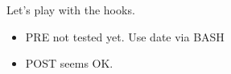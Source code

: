 \documentclass{article}
\begin{document}
Let's play with the hooks.

\begin{itemize}
    \item PRE not tested yet. Use date via BASH

    \item POST seems OK.
\end{itemize}
\end{document}
